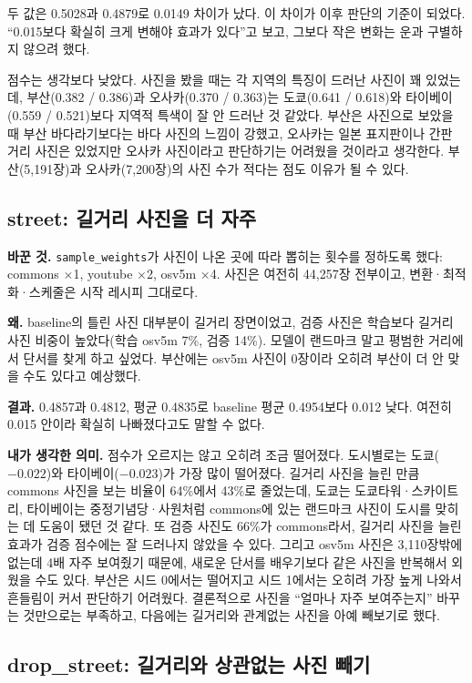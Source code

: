 \documentclass[11pt]{article}
\begin{document}
두 값은 0.5028과 0.4879로 0.0149 차이가 났다. 이 차이가 이후 판단의 기준이 되었다.
``0.015보다 확실히 크게 변해야 효과가 있다''고 보고, 그보다 작은 변화는 운과
구별하지 않으려 했다.

점수는 생각보다 낮았다. 사진을 봤을 때는 각 지역의 특징이 드러난 사진이 꽤
있었는데, 부산(0.382 / 0.386)과 오사카(0.370 / 0.363)는 도쿄(0.641 / 0.618)와
타이베이(0.559 / 0.521)보다 지역적 특색이 잘 안 드러난 것 같았다. 부산은 사진으로
보았을 때 부산 바다라기보다는 바다 사진의 느낌이 강했고, 오사카는 일본 표지판이나
간판 거리 사진은 있었지만 오사카 사진이라고 판단하기는 어려웠을 것이라고 생각한다.
부산(5,191장)과 오사카(7,200장)의 사진 수가 적다는 점도 이유가 될 수 있다.

\subsection*{street: 길거리 사진을 더 자주}

\textbf{바꾼 것.} \texttt{sample\_weights}가 사진이 나온 곳에 따라 뽑히는 횟수를
정하도록 했다: commons $\times$1, youtube $\times$2, osv5m $\times$4. 사진은 여전히
44,257장 전부이고, 변환·최적화·스케줄은 시작 레시피 그대로다.

\textbf{왜.} baseline의 틀린 사진 대부분이 길거리 장면이었고, 검증 사진은 학습보다
길거리 사진 비중이 높았다(학습 osv5m 7\%, 검증 14\%). 모델이 랜드마크 말고 평범한
거리에서 단서를 찾게 하고 싶었다. 부산에는 osv5m 사진이 0장이라 오히려 부산이 더
안 맞을 수도 있다고 예상했다.

\textbf{결과.} 0.4857과 0.4812, 평균 0.4835로 baseline 평균 0.4954보다 0.012
낮다. 여전히 0.015 안이라 확실히 나빠졌다고도 말할 수 없다.

\textbf{내가 생각한 의미.} 점수가 오르지는 않고 오히려 조금 떨어졌다. 도시별로는
도쿄($-0.022$)와 타이베이($-0.023$)가 가장 많이 떨어졌다. 길거리 사진을 늘린 만큼
commons 사진을 보는 비율이 64\%에서 43\%로 줄었는데, 도쿄는 도쿄타워·스카이트리,
타이베이는 중정기념당·사원처럼 commons에 있는 랜드마크 사진이 도시를 맞히는 데
도움이 됐던 것 같다. 또 검증 사진도 66\%가 commons라서, 길거리 사진을 늘린 효과가
검증 점수에는 잘 드러나지 않았을 수 있다. 그리고 osv5m 사진은 3,110장밖에 없는데
4배 자주 보여줬기 때문에, 새로운 단서를 배우기보다 같은 사진을 반복해서 외웠을
수도 있다. 부산은 시드 0에서는 떨어지고 시드 1에서는 오히려 가장 높게 나와서
흔들림이 커서 판단하기 어려웠다. 결론적으로 사진을 ``얼마나 자주 보여주는지''
바꾸는 것만으로는 부족하고, 다음에는 길거리와 관계없는 사진을 아예 빼보기로 했다.

\subsection*{drop\_street: 길거리와 상관없는 사진 빼기}
\end{document}
